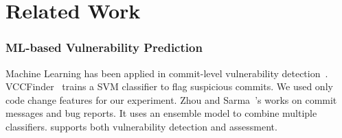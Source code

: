 \section{Related Work}







\subsubsection*{\bf ML-based Vulnerability Prediction}
Machine Learning has been applied in commit-level vulnerability
detection~\cite{perl2015vccfinder,zhou2017automated,chen2019large}.
VCCFinder~\cite{perl2015vccfinder} trains a SVM classifier to flag
suspicious commits. We used only code change features for our
experiment. Zhou and Sarma~\cite{zhou2017automated}'s works on commit
messages and bug reports. It uses an ensemble model to combine
multiple classifiers.
{\tool} supports both vulnerability detection and
assessment.

